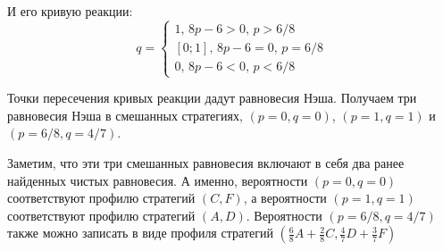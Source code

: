 \begin{problem}
\begin{sol}
И его кривую реакции:
\[
q=
\begin{cases}
1, \, 8p-6>0, \, p>6/8 \\
[0;1], \, 8p-6=0, \, p=6/8 \\
0, \, 8p-6<0, \, p<6/8
\end{cases}
\]

Точки пересечения кривых реакции дадут равновесия Нэша. Получаем три равновесия Нэша в смешанных стратегиях, $(p=0, q=0)$, $(p=1,q=1)$  и $(p=6/8,q=4/7)$.

Заметим, что эти  три  смешанных равновесия включают в себя два ранее найденных чистых равновесия. А именно, вероятности $(p=0,q=0)$ соответствуют профилю стратегий  $(C,F)$, а вероятности $(p=1,q=1)$ соответствуют профилю стратегий  $(A,D)$. Вероятности $(p=6/8,q=4/7)$ также можно записать в виде профиля стратегий $(\frac{6}{8}A+\frac{2}{8}C,\frac{4}{7}D+\frac{3}{7}F)$
\end{sol}
\end{problem}

